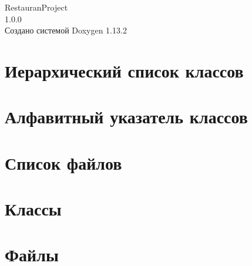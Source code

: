 \documentclass[twoside]{book}
\newcommand{\+}{\discretionary{\mbox{\scriptsize$\hookleftarrow$}}{}{}}
\newcommand{\clearemptydoublepage}{%
    \newpage{\pagestyle{empty}\cleardoublepage}%
  }
\begin{document}
  \raggedbottom
    \hypersetup{pageanchor=false,
                bookmarksnumbered=true,
                pdfencoding=unicode
               }
  \begin{titlepage}
  \vspace*{7cm}
  \begin{center}%
  {\Large Restauran\+Project}\\
  [1ex]\large 1.\+0.\+0 \\
  \vspace*{1cm}
  {\large Создано системой Doxygen 1.13.2}\\
  \end{center}
  \end{titlepage}
  \clearemptydoublepage
  \tableofcontents
  \clearemptydoublepage
  \hypersetup{pageanchor=true}
\chapter{Иерархический список классов}

\chapter{Алфавитный указатель классов}

\chapter{Список файлов}

\chapter{Классы}







\chapter{Файлы}






















  \backmatter
  \newpage
  \clearemptydoublepage
  \printindex
\end{document}
